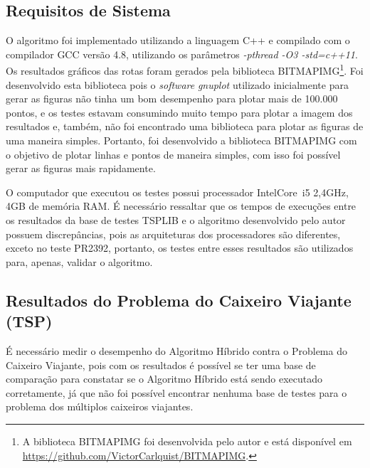 \documentclass[12pt,openright,a4paper,oneside]{tcc}
\begin{document}
        \subsection{Requisitos de Sistema}

		O algoritmo foi implementado utilizando a linguagem C++ e compilado com o compilador GCC versão 4.8, utilizando os parâmetros \textit{-pthread -O3 -std=c++11}. Os resultados gráficos das rotas foram gerados pela biblioteca BITMAPIMG\footnote{A biblioteca BITMAPIMG foi desenvolvida pelo autor e está disponível em \url{https://github.com/VictorCarlquist/BITMAPIMG}.}. Foi desenvolvido esta biblioteca pois o \textit{software} \textit{gnuplot} utilizado inicialmente para gerar as figuras não tinha um bom desempenho para plotar mais de 100.000 pontos, e os testes estavam consumindo muito tempo para plotar a imagem dos resultados e, também,  não foi encontrado uma biblioteca para plotar as figuras de uma maneira simples. Portanto, foi desenvolvido a biblioteca BITMAPIMG com o objetivo de plotar linhas e pontos de maneira simples, com isso foi possível gerar as figuras mais rapidamente.

		O computador que executou os testes possui processador Intel\textregistered Core\texttrademark ~i5 2,4GHz, 4GB de memória RAM. É necessário ressaltar que os tempos de execuções entre os resultados da base de testes TSPLIB e o algoritmo desenvolvido pelo autor possuem discrepâncias, pois as arquiteturas dos processadores são diferentes, exceto no teste PR2392, portanto, os testes entre esses resultados são utilizados para, apenas, validar o algoritmo.

		\subsection{Resultados do Problema do Caixeiro Viajante (TSP)}

		É necessário medir o desempenho do Algoritmo Híbrido contra o Problema do Caixeiro Viajante, pois com os resultados é possível se ter uma base de comparação para constatar se o Algoritmo Híbrido está sendo executado corretamente, já que não foi possível encontrar nenhuma base de testes para o problema dos múltiplos caixeiros viajantes.
\end{document}
